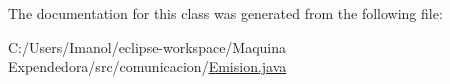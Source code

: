 The documentation for this class was generated from the following file\+:\begin{DoxyCompactItemize}
\item 
C\+:/\+Users/\+Imanol/eclipse-\/workspace/\+Maquina Expendedora/src/comunicacion/\mbox{\hyperlink{_emision_8java}{Emision.\+java}}\end{DoxyCompactItemize}
